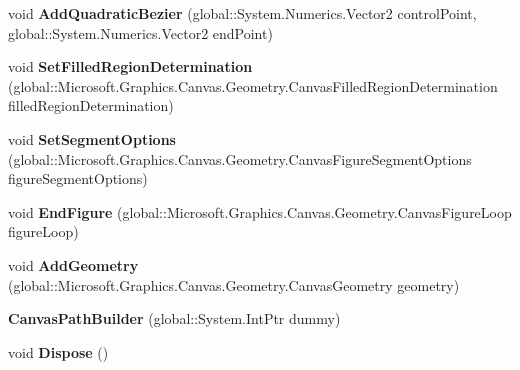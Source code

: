 \begin{DoxyCompactItemize}
void {\bfseries Add\+Quadratic\+Bezier} (global\+::\+System.\+Numerics.\+Vector2 control\+Point, global\+::\+System.\+Numerics.\+Vector2 end\+Point)
\item 
\mbox{\label{class_microsoft_1_1_graphics_1_1_canvas_1_1_geometry_1_1_canvas_path_builder_a933ad60d19366b2851e3ad2a78ce363c}} 
void {\bfseries Set\+Filled\+Region\+Determination} (global\+::\+Microsoft.\+Graphics.\+Canvas.\+Geometry.\+Canvas\+Filled\+Region\+Determination filled\+Region\+Determination)
\item 
\mbox{\label{class_microsoft_1_1_graphics_1_1_canvas_1_1_geometry_1_1_canvas_path_builder_a39666b72c541b2b7bf5ce95ef802b83f}} 
void {\bfseries Set\+Segment\+Options} (global\+::\+Microsoft.\+Graphics.\+Canvas.\+Geometry.\+Canvas\+Figure\+Segment\+Options figure\+Segment\+Options)
\item 
\mbox{\label{class_microsoft_1_1_graphics_1_1_canvas_1_1_geometry_1_1_canvas_path_builder_ae0a5d2f680c829d0627fd7361a291e5b}} 
void {\bfseries End\+Figure} (global\+::\+Microsoft.\+Graphics.\+Canvas.\+Geometry.\+Canvas\+Figure\+Loop figure\+Loop)
\item 
\mbox{\label{class_microsoft_1_1_graphics_1_1_canvas_1_1_geometry_1_1_canvas_path_builder_acb9326bae9395128543ba0a35a264122}} 
void {\bfseries Add\+Geometry} (global\+::\+Microsoft.\+Graphics.\+Canvas.\+Geometry.\+Canvas\+Geometry geometry)
\item 
\mbox{\label{class_microsoft_1_1_graphics_1_1_canvas_1_1_geometry_1_1_canvas_path_builder_a935c167a036e0d8d48a396c57ec7fa62}} 
{\bfseries Canvas\+Path\+Builder} (global\+::\+System.\+Int\+Ptr dummy)
\item 
\mbox{\label{class_microsoft_1_1_graphics_1_1_canvas_1_1_geometry_1_1_canvas_path_builder_a89be25e209b666fcd806f7e81cf7b139}} 
void {\bfseries Dispose} ()

\end{DoxyCompactItemize}
